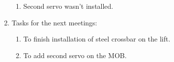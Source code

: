 \begin{enumerate}
\begin{enumerate}
	  \item Second servo wasn't installed.
	  
    \end{enumerate}
    
	\item Tasks for the next meetings:
	\begin{enumerate}
	  \item To finish installation of steel crossbar on the lift.
	  
	  \item To add second servo on the MOB.
	  
    \end{enumerate}     
\end{enumerate}
\fillpage